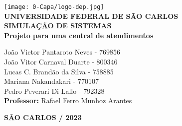 \justifying %
\onehalfspacing %
\setlength{\parindent}{0cm}  %
\renewcommand*\familydefault{\rmdefault}
\thispagestyle{empty}
\begin{center}
\texttt{[image: 0-Capa/logo-dep.jpg]}\\
\vspace*{.8cm}
{\huge \textbf{UNIVERSIDADE FEDERAL DE SÃO CARLOS}}\\
\vspace*{.8cm}
{\Large \textbf{SIMULAÇÃO DE SISTEMAS}}\\
\vspace*{3cm}
{\Large \textbf{Projeto para uma central de atendimentos}}\\
\vspace*{4.5cm}
\begin{flushright}
    \onehalfspacing
    {\Large  João Victor Pantaroto Neves - 769856}\\
    {\Large  João Vitor Carnaval Duarte - 800346}\\
    {\Large  Lucas C. Brandão da Silva - 758885}\\
    {\Large  Mariana Nakandakari  - 770107}\\
    {\Large  Pedro Peverari Di Lallo  - 792328}\\
    \vspace*{.3cm}
    {\Large \textbf{Professor:}}
    {\Large Rafael Ferro Munhoz Arantes}\\
\end{flushright}
\vspace*{\fill}
{\large \bf SÃO CARLOS / 2023}
\end{center}